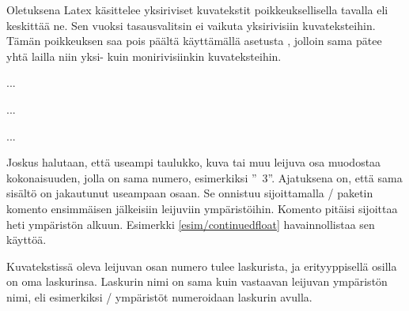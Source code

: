 \begin{koodilohkosis}
\end{koodilohkosis}

\noindent
Oletuksena Latex käsittelee yksiriviset kuvatekstit poikkeuksellisella
tavalla eli keskittää ne. Sen vuoksi tasausvalitsin
 ei vaikuta yksirivisiin kuvateksteihin. Tämän
poikkeuksen saa pois päältä käyttämällä asetusta
, jolloin sama
 pätee yhtä lailla niin yksi- kuin monirivisiinkin
kuvateksteihin.

\begin{esimerkki*}

\begin{koodilohko}
\begin{table}                 %
  \caption{Hieno taulukko}
  ...
\end{table}
...
\begin{table}                 %
  \ContinuedFloat             %
  \caption{Hieno taulukko (jatkuu)}
  ...
\end{table}
\end{koodilohko}

  \caption{Usealle leijuvalle osalle saa saman numeron käyttämällä
    jälkimmäisissä ympäristöissä komentoa }
  \label{esim/continuedfloat}
\end{esimerkki*}

Joskus halutaan, että useampi taulukko, kuva tai muu leijuva osa
muodostaa kokonaisuuden, jolla on sama numero, esimerkiksi
''\tablename~3''. Ajatuksena on, että sama sisältö on jakautunut
useampaan osaan. Se onnistuu sijoittamalla \-/ paketin
komento  ensimmäisen jälkeisiin leijuviin
ympäristöihin. Komento pitäisi sijoittaa heti ympäristön alkuun.
Esimerkki \ref{esim/continuedfloat} havainnollistaa sen käyttöä.

Kuvatekstissä oleva leijuvan osan numero tulee laskurista, ja
erityyppisellä osilla on oma laskurinsa. Laskurin nimi on sama kuin
vastaavan leijuvan ympäristön nimi, eli esimerkiksi \-/
ympäristöt numeroidaan laskurin  avulla.

